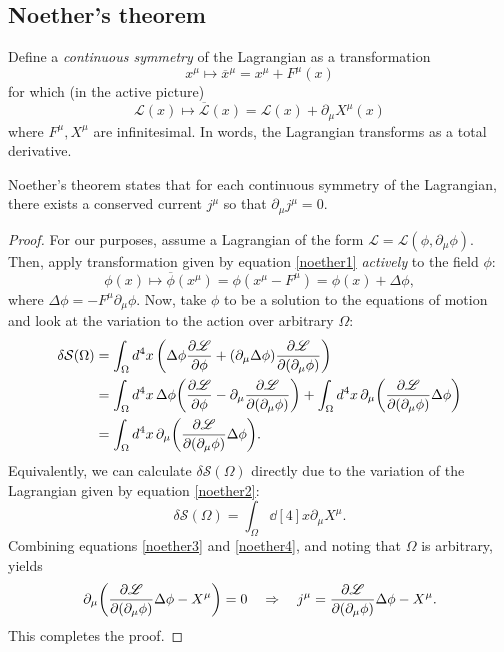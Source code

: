\documentclass{article}
\begin{document}
\subsection{Noether's theorem}
Define a \textit{continuous symmetry} of the Lagrangian as a transformation 
\begin{equation} \label{noether1}
	x^{\mu} \longmapsto \overbar{x}^{\mu} = x^{\mu} + F^{\mu}(x)
\end{equation}
for which (in the active picture)
\begin{equation} \label{noether2}
	\mathscr{L}(x) \longmapsto \overbar{\mathscr{L}}(x) = \mathscr{L}(x) + \partial_{\mu} X^{\mu}(x)
\end{equation}
where $ F^{\mu}, X^{\mu} $ are infinitesimal. In words, the Lagrangian transforms as a total derivative.
\par
Noether's theorem states that for each continuous symmetry of the Lagrangian, there exists a conserved current $ j^{\mu} $ so that $ \partial_{\mu} j^{\mu} = 0 $.
\begin{proof}
	For our purposes, assume a Lagrangian of the form $ \mathscr{L} = \mathscr{L}(\phi, \partial_{\mu} \phi) $. Then, apply transformation given by equation \eqref{noether1} \textit{actively} to the field $ \phi $:
	\begin{equation}
		\phi(x) \longmapsto \overbar{\phi} (x^{\mu}) = \phi(x^{\mu}-F^{\mu}) = \phi(x) + \Delta \phi,
	\end{equation}
	where $ \Delta \phi = - F^{\mu} \partial_{\mu} \phi $. Now, take $ \phi $ to be a solution to the equations of motion and look at the variation to the action over arbitrary $ \Omega $:
	\begin{align} \label{noether3}
		\begin{split}
			\delta \mathcal{S}(\Omega) &= \int_{\Omega} \dd[4]{x} \qty(\Delta \phi \pdv{\mathscr{L}}{\phi} + (\partial_{\mu} \Delta \phi) \pdv{\mathscr{L}}{(\partial_{\mu} \phi)}) \\
			&= \int_\Omega \dd[4]{x} \Delta \phi \qty(\pdv{\mathscr{L}}{\phi} - \partial_{\mu} \pdv{\mathscr{L}}{(\partial_{\mu} \phi)}) + \int_\Omega \dd[4]{x} \partial_{\mu} \qty(\pdv{\mathscr{L}}{(\partial_{\mu} \phi)} \Delta \phi) \\
			&= \int_\Omega \dd[4]{x} \partial_{\mu} \qty(\pdv{\mathscr{L}}{(\partial_{\mu} \phi)} \Delta \phi).
		\end{split}
	\end{align}
	Equivalently, we can calculate $ \delta \mathcal{S}(\Omega) $ directly due to the variation of the Lagrangian given by equation \eqref{noether2}:
	\begin{equation} \label{noether4}
		\delta \mathcal{S}(\Omega) = \int_\Omega \dd[4]{x} \partial_{\mu} X^{\mu}.
	\end{equation}
	Combining equations \eqref{noether3} and \eqref{noether4}, and noting that $ \Omega $ is arbitrary, yields
	\begin{gather} \label{noethercurrent}
		\partial_{\mu} \qty(\pdv{\mathscr{L}}{(\partial_{\mu} \phi)} \Delta \phi - X^{\mu}) = 0 
		\quad \Rightarrow \quad j^{\mu} = \pdv{\mathscr{L}}{(\partial_{\mu} \phi)} \Delta \phi - X^{\mu}.
	\end{gather}
	This completes the proof.
\end{proof}
\end{document}
